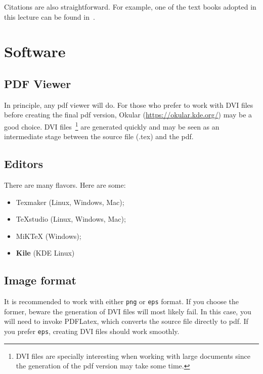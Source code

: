 \documentclass[a4paper, twoside, english]{article}
\begin{document}
Citations are also straightforward.
For example, one of the text books adopted in this lecture can be found in~\cite{Hartley2004}.

\section{Software}

\subsection{PDF Viewer}
In principle, any pdf viewer will do.
For those who prefer to work with DVI files before creating the final pdf version, Okular (\url{https://okular.kde.org/}) may be a good choice.
DVI files~\footnote{DVI files are specially interesting when working with large documents since the generation of the pdf version may take some time.} are generated quickly and may be seen as an 
intermediate stage between the source file (.tex) and the pdf.

\subsection{Editors}
There are many flavors.
Here are some:
\begin{itemize}
 \item Texmaker (Linux, Windows, Mac);
 \item TeXstudio (Linux, Windows, Mac);
 \item MiKTeX (Windows);
 \item \textbf{Kile} (KDE Linux)
\end{itemize}

\subsection{Image format}
It is recommended to work with either \texttt{png} or \texttt{eps} format.
If you choose the former, beware the generation of DVI files will most likely fail.
In this case, you will need to invoke PDFLatex, which converts the source file directly to pdf.
If you prefer \texttt{eps}, creating DVI files should work smoothly.



\end{document}
